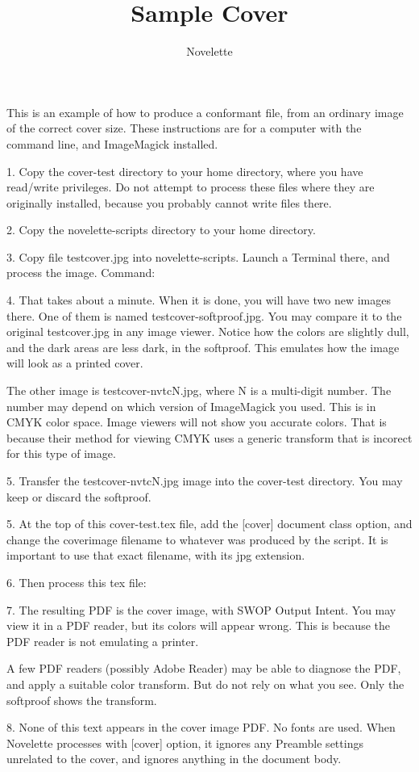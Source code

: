 \documentclass{novelette} %
\title{Sample Cover}
\author{Novelette}
\begin{document}
This is an example of how to produce a  conformant file,
from an ordinary image of the correct cover size. These instructions are
for a computer with the  command line, and ImageMagick installed.

1. Copy the cover-test directory to your home directory, where you
have read/write privileges. Do not attempt to process these files where
they are originally installed, because you probably cannot write files there.

2. Copy the novelette-scripts directory to your home directory.

3. Copy file testcover.jpg into novelette-scripts.
Launch a Terminal there, and process the image. Command:


4. That takes about a minute. When it is done, you will have two new images
there. One of them is named testcover-softproof.jpg. You may compare it
to the original testcover.jpg in any image viewer. Notice how the colors
are slightly dull, and the dark areas are less dark, in the softproof.
This emulates how the image will look as a printed cover.

The other image is testcover-nvtcN.jpg, where N is a multi-digit number.
The number may depend on which version of ImageMagick you used. This is
in CMYK color space. Image viewers will not show you accurate colors.
That is because their method for viewing CMYK uses a generic transform that
is incorect for this type of image.

5. Transfer the testcover-nvtcN.jpg image into the cover-test
directory. You may keep or discard the softproof.

5. At the top of this cover-test.tex file, add the [cover]
document class option, and change the coverimage filename to whatever was
produced by the script. It is important to use that exact filename, with its
jpg extension.

6. Then process this tex file:


\null

7. The resulting PDF is the cover image,  with SWOP Output
Intent. You may view it in a PDF reader, but its colors will appear wrong.
This is because the PDF reader is not emulating a printer.

A few PDF readers (possibly Adobe Reader) may be able to diagnose the PDF,
and apply a suitable color transform.
But do not rely on what you see. Only the softproof shows the transform.

8. None of this text appears in the cover image PDF. No fonts are used.
When Novelette processes with [cover] option, it ignores any Preamble
settings unrelated to the cover, and ignores anything in the document body.

\makeatletter\nocle@rtoendtrue\makeatother
\end{document}
